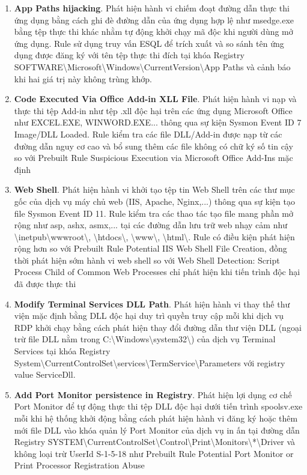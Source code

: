\begin{enumerate}
\item \textbf{App Paths hijacking}. Phát hiện hành vi chiếm đoạt đường dẫn thực thi ứng dụng bằng cách ghi đè đường dẫn của ứng dụng hợp lệ như msedge.exe bằng tệp thực thi khác nhằm tự động khởi chạy mã độc khi người dùng mở ứng dụng. Rule sử dụng truy vấn ESQL để trích xuất và so sánh tên ứng dụng được đăng ký với tên tệp thực thi đích tại khóa Registry SOFTWARE\textbackslash{}Microsoft\textbackslash{}Windows\textbackslash{}CurrentVersion\textbackslash{}App Paths và cảnh báo khi hai giá trị này không trùng khớp.
\item \textbf{Code Executed Via Office Add-in XLL File}. Phát hiện hành vi nạp và thực thi tệp Add-in như tệp .xll độc hại trên các ứng dụng Microsoft Office như EXCEL.EXE, WINWORD.EXE... thông qua sự kiện Sysmon Event ID 7 Image/DLL Loaded. Rule kiểm tra các file DLL/Add-in được nạp từ các đường dẫn nguy cơ cao và bổ sung thêm các file không có chữ ký số tin cậy so với Prebuilt Rule Suspicious Execution via Microsoft Office Add-Ins mặc định
\item \textbf{Web Shell}. Phát hiện hành vi khởi tạo tệp tin Web Shell trên các thư mục gốc của dịch vụ máy chủ web (IIS, Apache, Nginx,...) thông qua sự kiện tạo file Sysmon Event ID 11. Rule kiểm tra các thao tác tạo file mang phần mở rộng như asp, ashx, asmx,... tại các đường dẫn lưu trữ web nhạy cảm như \textbackslash{}inetpub\textbackslash{}wwwroot\textbackslash{}, \textbackslash{}htdocs\textbackslash{}, \textbackslash{}www\textbackslash{}, \textbackslash{}html\textbackslash{}. Rule có điều kiện phát hiện rộng hơn so với Prebuilt Rule Potential IIS Web Shell File Creation, đồng thời phát hiện sớm hành vi web shell so với Web Shell Detection: Script Process Child of Common Web Processes chỉ phát hiện khi tiến trình độc hại đã được thực thi
\item \textbf{Modify Terminal Services DLL Path}. Phát hiện hành vi thay thế thư viện mặc định bằng DLL độc hại duy trì quyền truy cập mỗi khi dịch vụ RDP khởi chạy bằng cách phát hiện thay đổi đường dẫn thư viện DLL (ngoại trừ file DLL nằm trong C:\textbackslash{}Windows\textbackslash{}system32\textbackslash{}) của dịch vụ Terminal Services tại khóa Registry System\textbackslash{}CurrentControlSet\textbackslash{}services\textbackslash{}TermService\textbackslash{}Parameters với registry value ServiceDll.
\item \textbf{Add Port Monitor persistence in Registry}. Phát hiện lợi dụng cơ chế Port Monitor để tự động thực thi tệp DLL độc hại dưới tiến trình spoolsv.exe mỗi khi hệ thống khởi động bằng cách phát hiện hành vi đăng ký hoặc thêm mới file DLL vào khóa quản lý Port Monitor của dịch vụ in ấn tại đường dẫn Registry SYSTEM\textbackslash{}CurrentControlSet\textbackslash{}Control\textbackslash{}Print\textbackslash{}Monitors\textbackslash{}*\textbackslash{}Driver và không loại trừ UserId S-1-5-18 như Prebuilt Rule Potential Port Monitor or Print Processor Registration Abuse

\end{enumerate}
